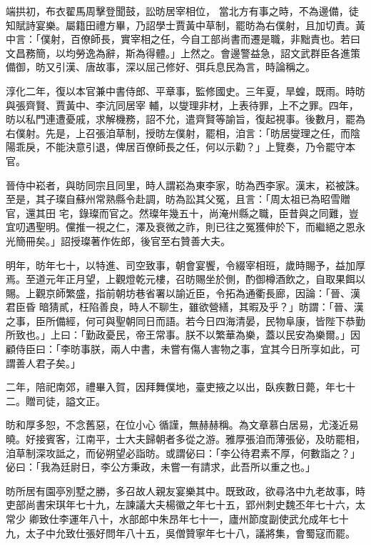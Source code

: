 \begin{pinyinscope}
 端拱初，布衣翟馬周擊登聞鼓，訟昉居宰相位，
 當北方有事之時，不為邊備，徒知賦詩宴樂。屬籍田禮方畢，乃詔學士賈黃中草制，罷昉為右僕射，且加切責。黃中言：「僕射，百僚師長，實宰相之任，今自工部尚書而遷是職，非黜責也。若曰文昌務簡，以均勞逸為辭，斯為得體。」上然之。會邊警益急，詔文武群臣各進策備御，昉又引漢、唐故事，深以屈己修好、弭兵息民為言，時論稱之。



 淳化二年，復以本官兼中書侍郎、平章事，監修國史。三年夏，旱蝗，既雨。時昉與張齊賢、賈黃中、李沆同居宰
 輔，以燮理非材，上表待罪，上不之罪。四年，昉以私門連遭憂戚，求解機務，詔不允，遣齊賢等諭旨，復起視事。後數月，罷為右僕射。先是，上召張洎草制，授昉左僕射，罷相，洎言：「昉居燮理之任，而陰陽乖戾，不能決意引退，俾居百僚師長之任，何以示勸？」上覽奏，乃令罷守本官。



 晉侍中崧者，與昉同宗且同里，時人謂崧為東李家，昉為西李家。漢末，崧被誅。至是，其子璨自蘇州常熟縣令赴調，昉為訟其父冤，且言：「周太祖已為昭雪贈官，還其田
 宅，錄璨而官之。然璨年幾五十，尚淹州縣之職，臣昔與之同難，豈宜叨遇聖明。儻推一視之仁，澤及衰微之祚，則已往之冤獲伸於下，而繼絕之恩永光簡冊矣。」詔授璨著作佐郎，後官至右贊善大夫。



 明年，昉年七十，以特進、司空致事，朝會宴饗，令綴宰相班，歲時賜予，益加厚焉。至道元年正月望，上觀燈乾元樓，召昉賜坐於側，酌御樽酒飲之，自取果餌以賜。上觀京師繁盛，指前朝坊巷省署以諭近臣，令拓為通衢長廊，因論：「晉、漢君臣昏
 暗猜貳，枉陷善良，時人不聊生，雖欲營繕，其暇及乎？」昉謂：「晉、漢之事，臣所備經，何可與聖朝同日而語。若今日四海清晏，民物阜康，皆陛下恭勤所致也。」上曰：「勤政憂民，帝王常事。朕不以繁華為樂，蓋以民安為樂爾。」因顧侍臣曰：「李昉事朕，兩人中書，未嘗有傷人害物之事，宜其今日所享如此，可謂善人君子矣。」



 二年，陪祀南郊，禮畢入賀，因拜舞僕地，臺吏掖之以出，臥疾數日薨，年七十二。贈司徒，謚文正。



 昉和厚多恕，不念舊惡，在位小心
 循謹，無赫赫稱。為文章慕白居易，尤淺近易曉。好接賓客，江南平，士大夫歸朝者多從之游。雅厚張洎而薄張佖，及昉罷相，洎草制深攻詆之，而佖朔望必詣昉。或謂佖曰：「李公待君素不厚，何數詣之？」佖曰：「我為廷尉日，李公方秉政，未嘗一有請求，此吾所以重之也。」



 昉所居有園亭別墅之勝，多召故人親友宴樂其中。既致政，欲尋洛中九老故事，時吏部尚書宋琪年七十九，左諫議大夫楊徽之年七十五，郢州刺史魏丕年七十六，太常少
 卿致仕李運年八十，水部郎中朱昂年七十一，廬州節度副使武允成年七十九，太子中允致仕張好問年八十五，吳僧贊寧年七十八，議將集，會蜀寇而罷。




\end{pinyinscope}
